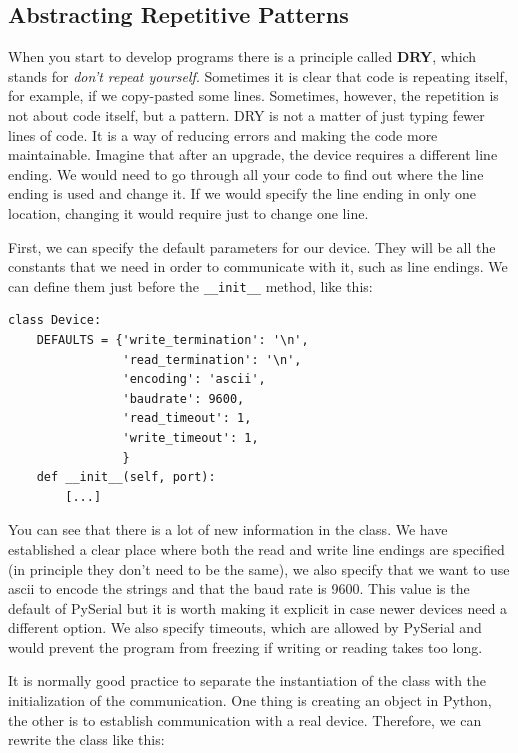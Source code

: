 \subsection{Abstracting Repetitive Patterns}
When you start to develop programs there is a principle called \textbf{DRY}, which stands for \emph{don't repeat yourself}. Sometimes it is clear that code is repeating itself, for example, if we copy-pasted some lines. Sometimes, however, the repetition is not about code itself, but a pattern. {DRY} is not a matter of just typing fewer lines of code. It is a way of reducing errors and making the code more maintainable. Imagine that after an upgrade, the device requires a different line ending. We would need to go through all your code to find out where the line ending is used and change it. If we would specify the line ending in only one location, changing it would require just to change one line.

First, we can specify the default parameters for our device. They will be all the constants that we need in order to communicate with it, such as line endings. We can define them just before the \texttt{__init__} method, like this:

\begin{verbatim}
class Device:
    DEFAULTS = {'write_termination': '\n',
                'read_termination': '\n',
                'encoding': 'ascii',
                'baudrate': 9600,
                'read_timeout': 1,
                'write_timeout': 1,
                }
    def __init__(self, port):
        [...]
\end{verbatim}

You can see that there is a lot of new information in the class. We have established a clear place where both the read and write line endings are specified (in principle they don't need to be the same), we also specify that we want to use ascii to encode the strings and that the baud rate is 9600. This value is the default of PySerial but it is worth making it explicit in case newer devices need a different option. We also specify timeouts, which are allowed by PySerial and would prevent the program from freezing if writing or reading takes too long.

It is normally good practice to separate the instantiation of the class with the initialization of the communication. One thing is creating an object in Python, the other is to establish communication with a real device. Therefore, we can rewrite the class like this:

